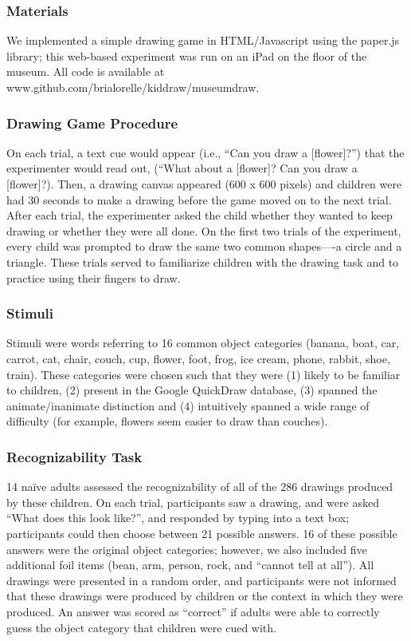 \documentclass[10pt, letterpaper]{article}
\begin{document}
\subsubsection{Materials}\label{materials}

We implemented a simple drawing game in HTML/Javascript using the
paper.js library; this web-based experiment was run on an iPad on the
floor of the museum. All code is available at
www.github.com/brialorelle/kiddraw/museumdraw.

\subsubsection{Drawing Game Procedure}\label{drawing-game-procedure}

On each trial, a text cue would appear (i.e., ``Can you draw a
{[}flower{]}?'') that the experimenter would read out, (``What about a
{[}flower{]}? Can you draw a {[}flower{]}?). Then, a drawing canvas
appeared (600 x 600 pixels) and children were had 30 seconds to make a
drawing before the game moved on to the next trial. After each trial,
the experimenter asked the child whether they wanted to keep drawing or
whether they were all done. On the first two trials of the experiment,
every child was prompted to draw the same two common shapes----a circle
and a triangle. These trials served to familiarize children with the
drawing task and to practice using their fingers to draw.

\subsubsection{Stimuli}\label{stimuli}

Stimuli were words referring to 16 common object categories (banana,
boat, car, carrot, cat, chair, couch, cup, flower, foot, frog, ice
cream, phone, rabbit, shoe, train). These categories were chosen such
that they were (1) likely to be familiar to children, (2) present in the
Google QuickDraw database, (3) spanned the animate/inanimate distinction
and (4) intuitively spanned a wide range of difficulty (for example,
flowers seem easier to draw than couches).

\subsubsection{Recognizability Task}\label{recognizability-task}

14 naïve adults assessed the recognizability of all of the 286 drawings
produced by these children. On each trial, participants saw a drawing,
and were asked ``What does this look like?'', and responded by typing
into a text box; participants could then choose between 21 possible
answers. 16 of these possible answers were the original object
categories; however, we also included five additional foil items (bean,
arm, person, rock, and ``cannot tell at all''). All drawings were
presented in a random order, and participants were not informed that
these drawings were produced by children or the context in which they
were produced. An answer was scored as ``correct'' if adults were able
to correctly guess the object category that children were cued with.
\end{document}
